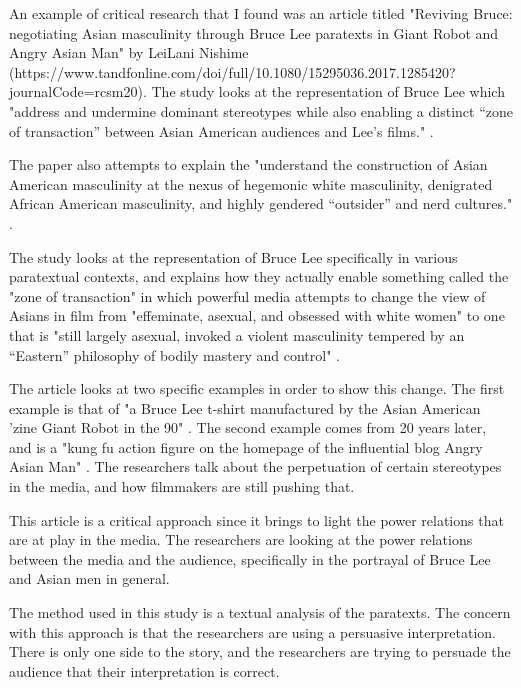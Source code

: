 \documentclass[a4paper]{article}
\begin{document}
        An example of critical research that I found was an article titled "Reviving Bruce: negotiating Asian masculinity 
        through Bruce Lee paratexts in Giant Robot and Angry Asian Man" by LeiLani Nishime \citep{nishime2016} 
        ({https://www.tandfonline.com/doi/full/10.1080/15295036.2017.1285420?journalCode=rcsm20}). The study looks at the 
        representation of Bruce Lee which "address and undermine dominant stereotypes while also enabling a distinct 
        “zone of transaction” between Asian American audiences and Lee's films." \citep{nishime2016}. 

        The paper also attempts to explain the "understand the construction of Asian American masculinity 
        at the nexus of hegemonic white masculinity, denigrated African American masculinity, 
        and highly gendered “outsider” and nerd cultures." \citep{nishime2016}.

        The study looks at the representation of Bruce Lee specifically in various paratextual contexts, and 
        explains how they actually enable something called the "zone of transaction" in which powerful media 
        attempts to change the view of Asians in film from "effeminate, asexual, and obsessed with white women" 
        to one that is "still largely asexual, invoked a violent masculinity tempered by an “Eastern” philosophy of 
        bodily mastery and control" \citep{nishime2016}. 

        The article looks at two specific examples in order to show this change. The first example is that of 
        "a Bruce Lee t-shirt manufactured by the Asian American 'zine Giant Robot in the 90" \citep{nishime2016}. 
        The second example comes from 20 years later, and is a "kung fu action figure on the homepage of the influential 
        blog Angry Asian Man" \citep{nishime2016}. The researchers talk about the perpetuation of certain stereotypes
        in the media, and how filmmakers are still pushing that. 

        This article is a critical approach since it brings to light the power relations that are at 
        play in the media. The researchers are looking at the power relations between the media and the
        audience, specifically in the portrayal of Bruce Lee and Asian men in general. 

        The method used in this study is a textual analysis of the paratexts. The concern with this approach is that
        the researchers are using a persuasive interpretation. There is only one side to the story, and the researchers
        are trying to persuade the audience that their interpretation is correct. 

        \pagebreak
        
        
        \cite{wood2017}
        \cite{kobeTweet}
        \cite{eckart2022}
        \cite{nishime2016}
\end{document}
